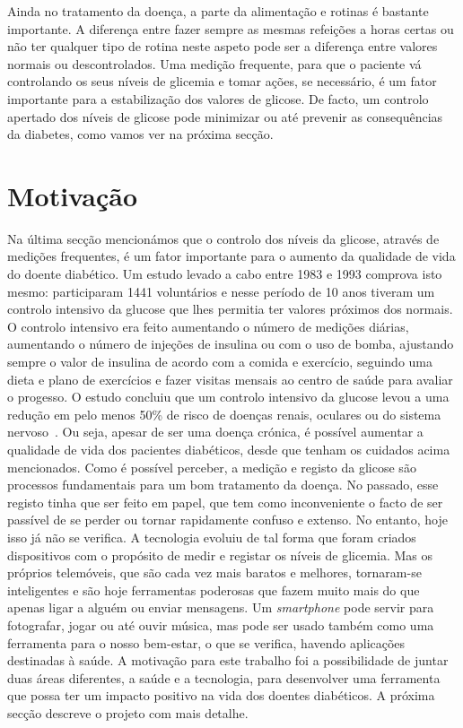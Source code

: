 Ainda no tratamento da doença, a parte da alimentação e rotinas é bastante importante. A diferença entre fazer sempre as mesmas refeições a horas certas ou não ter qualquer tipo de rotina neste aspeto pode ser a diferença entre valores normais ou descontrolados. Uma medição frequente, para que o paciente vá controlando os seus níveis de glicemia e tomar ações, se necessário, é um fator importante para a estabilização dos valores de glicose. 
De facto, um controlo apertado dos níveis de glicose pode minimizar ou até prevenir as consequências da diabetes, como vamos ver na próxima secção.



\section{Motivação}

Na última secção mencionámos que o controlo dos níveis da glicose, através de medições frequentes, é um fator importante para o aumento da qualidade de vida do doente diabético. Um estudo levado a cabo entre 1983 e 1993 comprova isto mesmo: participaram 1441 voluntários e nesse período de 10 anos tiveram um controlo intensivo da glucose que lhes permitia ter valores próximos dos normais. O controlo intensivo era feito aumentando o número de medições diárias, aumentando o número de injeções de insulina ou com o uso de bomba, ajustando sempre o valor de insulina de acordo com a comida e exercício, seguindo uma dieta e plano de exercícios e fazer visitas mensais ao centro de saúde para avaliar o progesso. O estudo concluiu que um controlo intensivo da glucose levou a uma redução em pelo menos 50\% de risco de doenças renais, oculares ou do sistema nervoso~\cite{edit}.
Ou seja, apesar de ser uma doença crónica, é possível aumentar a qualidade de vida dos pacientes diabéticos, desde que tenham os cuidados acima mencionados. 
Como é possível perceber, a medição e registo da glicose são processos fundamentais para um bom tratamento da doença. No passado, esse registo tinha que ser feito em papel, que tem como inconveniente o facto de ser passível de se perder ou tornar rapidamente confuso e extenso. No entanto, hoje isso já não se verifica.
A tecnologia evoluiu de tal forma que foram criados dispositivos com o propósito de medir e registar os níveis de glicemia. Mas os próprios telemóveis, que são cada vez mais baratos e melhores, tornaram-se inteligentes e são hoje ferramentas poderosas que fazem muito mais do que apenas ligar a alguém ou enviar mensagens. 
Um \textit{smartphone} pode servir para fotografar, jogar ou até ouvir música, mas pode ser usado também como uma ferramenta para o nosso bem-estar, o que se verifica, havendo aplicações destinadas à saúde. A motivação para este trabalho foi a possibilidade de juntar duas áreas diferentes, a saúde e a tecnologia, para desenvolver uma ferramenta que possa ter um impacto positivo na vida dos doentes diabéticos. A próxima secção descreve o projeto com mais detalhe.


